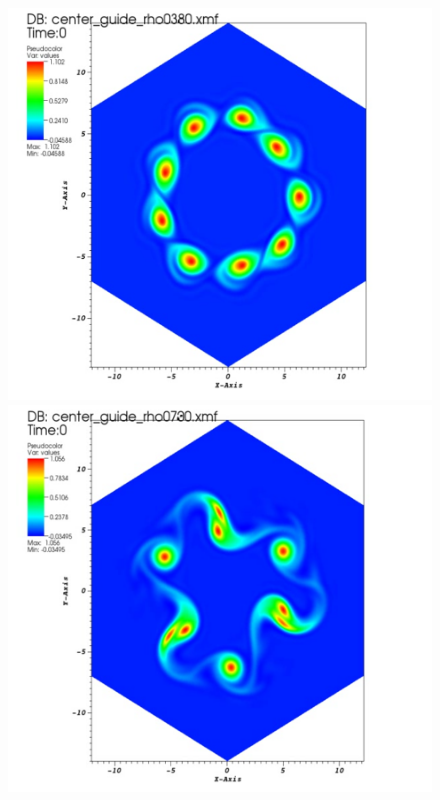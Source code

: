 \documentclass[proc]{edpsmath}
\begin{document}
\begin{figure}[h!]
	\includegraphics[scale=0.15]{figures/gc_spl_3.png}
	\includegraphics[scale=0.15]{figures/gc_spl_4.png}

\end{figure}
\end{document}
